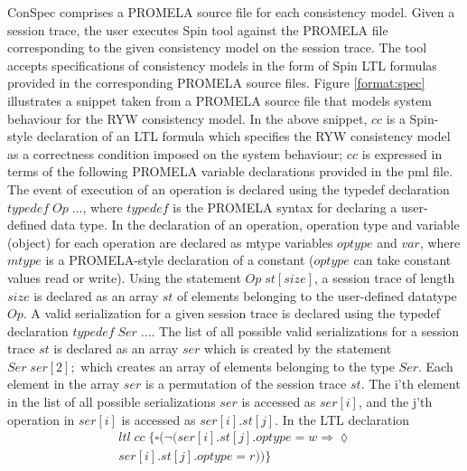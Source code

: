 \documentclass[journal,compsoc]{IEEEtran}
\begin{document}
  \par ConSpec comprises a PROMELA source file for each consistency model. Given a session trace, the user executes Spin tool against the PROMELA file corresponding to the given consistency model on the session trace. The tool accepts specifications of consistency models in the form of Spin LTL  formulas provided in the corresponding PROMELA source files.  Figure \ref{format:spec} illustrates a snippet taken from a  PROMELA  source file that models system behaviour for the RYW consistency model. In the above snippet, $\mathit{cc}$ is a Spin-style declaration of an LTL formula which specifies the RYW consistency model as a correctness condition imposed on the system behaviour; $\mathit{cc}$ is expressed in terms of the following PROMELA variable declarations provided in the pml file. The event of execution of an operation is declared using the typedef declaration  $\mathit{typedef}\; \mathit{Op}\; ...$, where $\mathit{typedef}$ is the PROMELA syntax for declaring a user-defined data type. In the declaration of an operation, operation type and variable (object) for each operation are declared as  mtype variables $\mathit{optype}$ and $\mathit{var}$, where $\mathit{mtype} $ is a PROMELA-style declaration of a constant ($\mathit{optype}$ can take constant values read or write).  Using the statement $\mathit{Op} \; \mathit{st}[\mathit{size}]$, a session trace of length $\mathit{size}$ is declared as an array $\mathit{st} $ of elements belonging to the user-defined datatype $\mathit{Op}$.  A valid serialization for a given session trace is declared using the typedef declaration $\mathit{typedef}\; \mathit{Ser}\; ...$.  The list of all possible valid serializations for a session trace $\mathit{st}$ is declared as an array $\mathit{ser}$ which is created by the statement $\mathit{Ser}\; \mathit{ser}[2];$ which creates an array of elements belonging to the type $\mathit{Ser}$. Each element in the array $\mathit{ser}$ is a permutation of the session trace $\mathit{st}$. The i'th element in the list of all possible serializations $\mathit{ser}$ is accessed as $\mathit{ser}[i]$, and the j'th operation in $\mathit{ser}[i]$ is accessed as $\mathit{ser}[i].\mathit{st}[j]$. In the LTL declaration 
  \begin{align*}%
 ltl \; \mathit{cc}  \; \{  \square ( \lnot (\mathit{ser}[i].\mathit{st}[j].\mathit{optype} = w 
   \Rightarrow \lozenge \\  \mathit{ser}[i].\mathit{st}[j].\mathit{optype} = r)) \}
    \end{align*}
\end{document}

